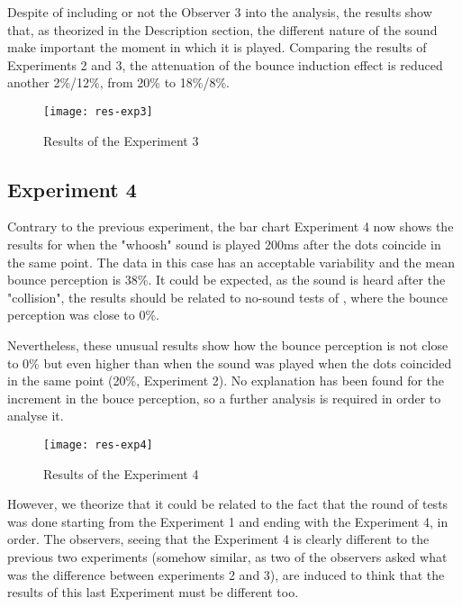 Despite of including or not the Observer 3 into the analysis, the results show that, as theorized in the Description section, the different nature of the sound make important the moment in which it is played. Comparing the results of Experiments 2 and 3, the attenuation of the bounce induction effect is reduced another 2\%/12\%, from 20\% to 18\%/8\%. 

\clearpage

\begin{figure}[!ht]
		\centering
		\vspace{0.5cm}
		\texttt{[image: res-exp3]}
		\caption{Results of the Experiment 3}
\end{figure} 

\subsection{Experiment 4}
 Contrary to the previous experiment, the bar chart Experiment 4 now shows the results for when the "whoosh" sound is played 200ms after the dots coincide in the same point. The data in this case has an acceptable variability and the mean bounce perception is 38\%. It could be expected, as the sound is heard after the "collision", the results should be related to no-sound tests of \cite{watanabe2001}, where the bounce perception was close to 0\%.

Nevertheless, these unusual results show how the bounce perception is not close to 0\% but even higher than when the sound was played when the dots coincided in the same point (20\%, Experiment 2). No explanation has been found for the increment in the bouce perception, so a further analysis is required in order to analyse it. 

\clearpage

\begin{figure}[!ht]
		\centering
		\vspace{0.5cm}
		\texttt{[image: res-exp4]}
		\caption{Results of the Experiment 4}
\end{figure} 

However, we theorize that it could be related to the fact that the round of tests was done starting from the Experiment 1 and ending with the Experiment 4, in order. The observers, seeing that the Experiment 4 is clearly different to the previous two experiments (somehow similar, as two of the observers asked what was the difference between experiments 2 and 3), are induced to think that the results of this last Experiment must be different too. 
